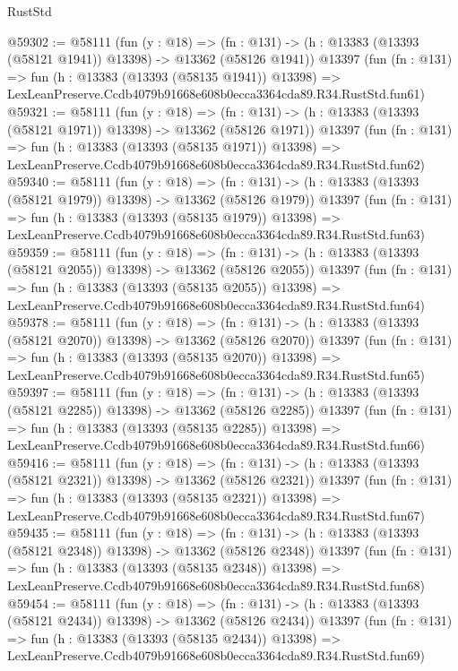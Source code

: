 \begin{lexlean}{RustStd}
\begin{coremodule}
@59302 := @58111
    (fun (y : @18) =>
    (fn : @131) -> (h : @13383 (@13393 (@58121 @1941)) @13398) -> @13362 (@58126 @1941))
    @13397
    (fun (fn : @131) =>
    fun (h : @13383 (@13393 (@58135 @1941)) @13398) =>
    LexLeanPreserve.Ccdb4079b91668e608b0ecca3364cda89.R34.RustStd.fun61)
@59321 := @58111
    (fun (y : @18) =>
    (fn : @131) -> (h : @13383 (@13393 (@58121 @1971)) @13398) -> @13362 (@58126 @1971))
    @13397
    (fun (fn : @131) =>
    fun (h : @13383 (@13393 (@58135 @1971)) @13398) =>
    LexLeanPreserve.Ccdb4079b91668e608b0ecca3364cda89.R34.RustStd.fun62)
@59340 := @58111
    (fun (y : @18) =>
    (fn : @131) -> (h : @13383 (@13393 (@58121 @1979)) @13398) -> @13362 (@58126 @1979))
    @13397
    (fun (fn : @131) =>
    fun (h : @13383 (@13393 (@58135 @1979)) @13398) =>
    LexLeanPreserve.Ccdb4079b91668e608b0ecca3364cda89.R34.RustStd.fun63)
@59359 := @58111
    (fun (y : @18) =>
    (fn : @131) -> (h : @13383 (@13393 (@58121 @2055)) @13398) -> @13362 (@58126 @2055))
    @13397
    (fun (fn : @131) =>
    fun (h : @13383 (@13393 (@58135 @2055)) @13398) =>
    LexLeanPreserve.Ccdb4079b91668e608b0ecca3364cda89.R34.RustStd.fun64)
@59378 := @58111
    (fun (y : @18) =>
    (fn : @131) -> (h : @13383 (@13393 (@58121 @2070)) @13398) -> @13362 (@58126 @2070))
    @13397
    (fun (fn : @131) =>
    fun (h : @13383 (@13393 (@58135 @2070)) @13398) =>
    LexLeanPreserve.Ccdb4079b91668e608b0ecca3364cda89.R34.RustStd.fun65)
@59397 := @58111
    (fun (y : @18) =>
    (fn : @131) -> (h : @13383 (@13393 (@58121 @2285)) @13398) -> @13362 (@58126 @2285))
    @13397
    (fun (fn : @131) =>
    fun (h : @13383 (@13393 (@58135 @2285)) @13398) =>
    LexLeanPreserve.Ccdb4079b91668e608b0ecca3364cda89.R34.RustStd.fun66)
@59416 := @58111
    (fun (y : @18) =>
    (fn : @131) -> (h : @13383 (@13393 (@58121 @2321)) @13398) -> @13362 (@58126 @2321))
    @13397
    (fun (fn : @131) =>
    fun (h : @13383 (@13393 (@58135 @2321)) @13398) =>
    LexLeanPreserve.Ccdb4079b91668e608b0ecca3364cda89.R34.RustStd.fun67)
@59435 := @58111
    (fun (y : @18) =>
    (fn : @131) -> (h : @13383 (@13393 (@58121 @2348)) @13398) -> @13362 (@58126 @2348))
    @13397
    (fun (fn : @131) =>
    fun (h : @13383 (@13393 (@58135 @2348)) @13398) =>
    LexLeanPreserve.Ccdb4079b91668e608b0ecca3364cda89.R34.RustStd.fun68)
@59454 := @58111
    (fun (y : @18) =>
    (fn : @131) -> (h : @13383 (@13393 (@58121 @2434)) @13398) -> @13362 (@58126 @2434))
    @13397
    (fun (fn : @131) =>
    fun (h : @13383 (@13393 (@58135 @2434)) @13398) =>
    LexLeanPreserve.Ccdb4079b91668e608b0ecca3364cda89.R34.RustStd.fun69)

\end{coremodule}
\end{lexlean}
